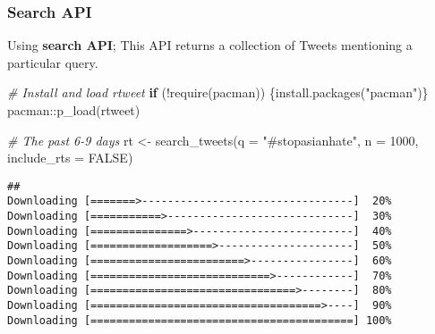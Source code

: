 \documentclass[
]{book}
\newenvironment{Shaded}{\begin{snugshade}}{\end{snugshade}}
\newcommand{\AttributeTok}[1]{\textcolor[rgb]{0.77,0.63,0.00}{#1}}
\newcommand{\CommentTok}[1]{\textcolor[rgb]{0.56,0.35,0.01}{\textit{#1}}}
\newcommand{\ConstantTok}[1]{\textcolor[rgb]{0.00,0.00,0.00}{#1}}
\newcommand{\ControlFlowTok}[1]{\textcolor[rgb]{0.13,0.29,0.53}{\textbf{#1}}}
\newcommand{\DecValTok}[1]{\textcolor[rgb]{0.00,0.00,0.81}{#1}}
\newcommand{\FunctionTok}[1]{\textcolor[rgb]{0.00,0.00,0.00}{#1}}
\newcommand{\NormalTok}[1]{#1}
\newcommand{\OtherTok}[1]{\textcolor[rgb]{0.56,0.35,0.01}{#1}}
\newcommand{\SpecialCharTok}[1]{\textcolor[rgb]{0.00,0.00,0.00}{#1}}
\newcommand{\StringTok}[1]{\textcolor[rgb]{0.31,0.60,0.02}{#1}}
\begin{document}
\hypertarget{search-api}{%
\subsubsection{Search API}\label{search-api}}

Using \textbf{search API}; This API returns a collection of Tweets mentioning a particular query.

\begin{Shaded}
\begin{Highlighting}[]
\CommentTok{\# Install and load rtweet }
\ControlFlowTok{if}\NormalTok{ (}\SpecialCharTok{!}\FunctionTok{require}\NormalTok{(pacman)) \{}\FunctionTok{install.packages}\NormalTok{(}\StringTok{"pacman"}\NormalTok{)\}}
\NormalTok{pacman}\SpecialCharTok{::}\FunctionTok{p\_load}\NormalTok{(rtweet)}

\CommentTok{\# The past 6{-}9 days }
\NormalTok{rt }\OtherTok{\textless{}{-}} \FunctionTok{search\_tweets}\NormalTok{(}\AttributeTok{q =} \StringTok{"\#stopasianhate"}\NormalTok{, }\AttributeTok{n =} \DecValTok{1000}\NormalTok{, }\AttributeTok{include\_rts =} \ConstantTok{FALSE}\NormalTok{)}
\end{Highlighting}
\end{Shaded}

\begin{verbatim}
## 
Downloading [=======>---------------------------------]  20%
Downloading [===========>-----------------------------]  30%
Downloading [===============>-------------------------]  40%
Downloading [===================>---------------------]  50%
Downloading [========================>----------------]  60%
Downloading [============================>------------]  70%
Downloading [================================>--------]  80%
Downloading [====================================>----]  90%
Downloading [=========================================] 100%
\end{verbatim}

\begin{Shaded}
\end{Shaded}
\end{document}
